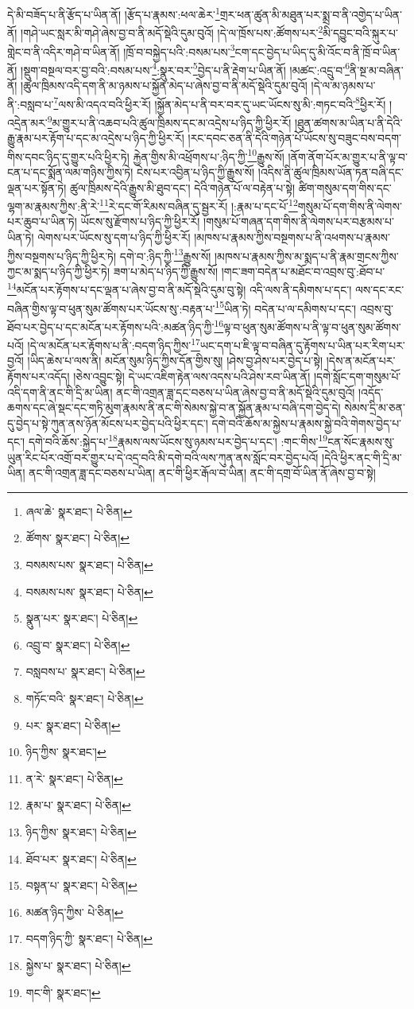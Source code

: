 དེ་མི་བཟོད་པ་ནི་རྩོད་པ་ཡིན་ནོ། །རྩོད་པ་རྣམས་:ཕལ་ཆེར་\footnote{ཞལ་ཆེ་  སྣར་ཐང་།  པེ་ཅིན། }གྲར་ཕན་ཚུན་མི་མཐུན་པར་སྨྲ་བ་ནི་འགྱེད་པ་ཡིན་ནོ། །གཤེ་ཡང་སླར་མི་གཤེ་ཞེས་བྱ་བ་ནི་མདོ་སྡེའི་དུམ་བུའོ། །དེ་ལ་ཁྲོས་པས་:ཚོགས་པར་\footnote{ཚོགས་  སྣར་ཐང་།  པེ་ཅིན། }མི་དབྱུང་བའི་སྐུར་པ་གླེང་བ་ནི་འདིར་གཤེ་བ་ཡིན་ནོ། །ཁྲོ་བ་བསྐྱེད་པའི་:བསམ་པས་\footnote{བསམས་པས་  སྣར་ཐང་།  པེ་ཅིན། }ངག་དང་བྱེད་པ་ཡིད་དུ་མི་འོང་བ་ནི་ཁྲོ་བ་ཡིན་ནོ། །སྡུག་བསྔལ་བར་བྱ་བའི་:བསམ་པས་\footnote{བསམས་པས་  སྣར་ཐང་།  པེ་ཅིན། }:སྣུར་བར་\footnote{སྣུན་པར་  སྣར་ཐང་།  པེ་ཅིན། }བྱེད་པ་ནི་རྡེག་པ་ཡིན་ནོ། །མཚང་:འདྲུ་བ་\footnote{འབྲུ་བ་  སྣར་ཐང་།  པེ་ཅིན། }ནི་སྔ་མ་བཞིན་ནོ། །ཚུལ་ཁྲིམས་འདི་དག་ནི་མ་ཉམས་པ་སྐྱོན་མེད་པ་ཞེས་བྱ་བ་ནི་མདོ་སྡེའི་དུམ་བུའོ། །དེ་ལ་མ་ཉམས་པ་ནི་:བསླབ་པ་\footnote{བསླབས་པ་  སྣར་ཐང་།  པེ་ཅིན། }ལས་མི་འདའ་བའི་ཕྱིར་རོ། །སྐྱོན་མེད་པ་ནི་བར་བར་དུ་ཡང་ཡོངས་སུ་མི་:གཏང་བའི་\footnote{གཏོང་བའི་  སྣར་ཐང་།  པེ་ཅིན། }ཕྱིར་རོ། །འདྲེན་མར་\footnote{པར་  སྣར་ཐང་།  པེ་ཅིན། }མ་གྱུར་པ་ནི་འཆབ་པའི་ཚུལ་ཁྲིམས་དང་མ་འདྲེས་པ་ཉིད་ཀྱི་ཕྱིར་རོ། །ཐུན་ཚགས་མ་ཡིན་པ་ནི་དེའི་རྒྱུ་རྣམ་པར་རྟོག་པ་དང་མ་འདྲེས་པ་ཉིད་ཀྱི་ཕྱིར་རོ། །རང་དབང་ཅན་ནི་དེའི་གཉེན་པོ་ཡོངས་སུ་བཟུང་བས་བདག་གིས་དབང་ཉིད་དུ་གྱུར་པའི་ཕྱིར་ཏེ། རྐྱེན་གྱིས་མི་འཕྲོགས་པ་:ཉིད་ཀྱི་\footnote{ཉིད་ཀྱིས་  སྣར་ཐང་། }རྒྱུས་སོ། །ནོག་ནོག་པོར་མ་གྱུར་པ་ནི་ལྟ་བ་ངན་པ་དང་སྨོན་ལམ་གཉིས་ཀྱིས་ཏེ། ངེས་པར་འབྱིན་པ་ཉིད་ཀྱི་རྒྱུས་སོ། །འདིས་ནི་ཚུལ་ཁྲིམས་ཡོན་ཏན་བཞི་དང་ལྡན་པར་སྟོན་ཏེ། ཚུལ་ཁྲིམས་དེའི་རྒྱུས་མི་ཐུབ་དང་། དེའི་གཉེན་པོ་ལ་བརྟེན་པ་སྟེ། ཚིག་གསུམ་དག་གིས་དང་ལྷག་མ་རྣམས་ཀྱིས་:ནི་རེ་\footnote{ན་རེ་  སྣར་ཐང་།  པེ་ཅིན། }རེ་དང་གོ་རིམས་བཞིན་དུ་སྦྱར་རོ། །:རྣམ་པ་དང་པོ་\footnote{རྣམ་པ་  སྣར་ཐང་།  པེ་ཅིན། }གསུམ་པོ་དག་གིས་ནི་ལེགས་པར་ཆུབ་པ་ཡིན་ཏེ། ཡོངས་སུ་རྫོགས་པ་ཉིད་ཀྱི་ཕྱིར་རོ། །གསུམ་པོ་གཞན་དག་གིས་ནི་ལེགས་པར་བརྩམས་པ་ཡིན་ཏེ། ལེགས་པར་ཡོངས་སུ་དག་པ་ཉིད་ཀྱི་ཕྱིར་རོ། །མཁས་པ་རྣམས་ཀྱིས་བསྔགས་པ་ནི་འཕགས་པ་རྣམས་ཀྱིས་བསྔགས་པ་ཉིད་ཀྱི་ཕྱིར་ཏེ། དགེ་བ་:ཉིད་ཀྱི་\footnote{ཉིད་ཀྱིས་  སྣར་ཐང་།  པེ་ཅིན། }རྒྱུས་སོ། །མཁས་པ་རྣམས་ཀྱིས་མ་སྨད་པ་ནི་རྣམ་གྲངས་ཀྱིས་ཀྱང་མ་སྨད་པ་ཉིད་ཀྱི་ཕྱིར་ཏེ། ཟག་པ་མེད་པ་ཉིད་ཀྱི་རྒྱུས་སོ། །གང་ཟག་བདེན་པ་མཐོང་བ་འབྲས་བུ་:ཐོབ་པ་\footnote{ཐོབ་པར་  སྣར་ཐང་།  པེ་ཅིན། }མངོན་པར་རྟོགས་པ་དང་ལྡན་པ་ཞེས་བྱ་བ་ནི་མདོ་སྡེའི་དུམ་བུ་སྟེ། འདི་ལས་ནི་དམིགས་པ་དང་། ལས་དང་རང་བཞིན་གྱིས་ལྟ་བ་ཕུན་སུམ་ཚོགས་པར་ཡོངས་སུ་:བརྟན་པ་\footnote{བསྟན་པ་  སྣར་ཐང་།  པེ་ཅིན། }ཡིན་ཏེ། བདེན་པ་ལ་དམིགས་པ་དང་། འབྲས་བུ་ཐོབ་པར་བྱེད་པ་དང་མངོན་པར་རྟོགས་པའི་:མཚན་ཉིད་ཀྱི་\footnote{མཚན་ཉིད་ཀྱིས་  པེ་ཅིན། }ལྟ་བ་ཕུན་སུམ་ཚོགས་པ་ནི་ལྟ་བ་ཕུན་སུམ་ཚོགས་པའོ། །དེ་ལ་མངོན་པར་རྟོགས་པ་ནི་:བདག་ཉིད་ཀྱིས་\footnote{བདག་ཉིད་ཀྱི་  སྣར་ཐང་།  པེ་ཅིན། }ཡང་དག་པ་ཇི་ལྟ་བ་བཞིན་དུ་རྟོགས་པ་ཡིན་པར་རིག་པར་བྱའོ། །ཡིད་ཆེས་པ་ལས་ནི། མངོན་སུམ་ཉིད་ཀྱིས་དོན་གྱིས་སུ། །ཤེས་བྱ་ཤེས་པར་བྱེད་པ་སྟེ། །དེས་ན་མངོན་པར་རྟོགས་པར་འདོད། །ཅེས་འབྱུང་སྟེ། དེ་ཡང་འཇིག་རྟེན་ལས་འདས་པའི་ཤེས་རབ་ཡིན་ནོ། །དགེ་སློང་དག་གསུམ་པོ་འདི་དག་ནི་ནང་གི་དྲི་མ་ཡིན། ནང་གི་འགྲན་ཟླ་དང་བཅས་པ་ཡིན་ཞེས་བྱ་བ་ནི་མདོ་སྡེའི་དུམ་བུའོ། །འདོད་ཆགས་དང་ཞེ་སྡང་དང་གཏི་མུག་རྣམས་ནི་ནང་གི་སེམས་སྐྱེ་བ་ན་སྐྱོན་རྣམ་པ་བཞི་དག་བྱེད་དེ། སེམས་དྲི་མ་ཅན་དུ་བྱེད་པ་སྟེ་ཀུན་ནས་ཉོན་མོངས་པར་བྱེད་པའི་ཕྱིར་དང་། དགེ་བའི་ཆོས་མ་སྐྱེས་པ་རྣམས་སྐྱེ་བའི་གེགས་བྱེད་པ་དང་། དགེ་བའི་ཆོས་:སྐྱེད་པ་\footnote{སྐྱེས་པ་  སྣར་ཐང་།  པེ་ཅིན། }རྣམས་ལས་ཡོངས་སུ་ཉམས་པར་བྱེད་པ་དང་། :གང་གིས་\footnote{གང་གི་  སྣར་ཐང་། }ངན་སོང་རྣམས་སུ་ཡུན་རིང་པོར་འགྲོ་བར་གྱུར་པ་དེ་འདྲ་བའི་མི་དགེ་བའི་ལས་ཀུན་ནས་སློང་བར་བྱེད་པའོ། །དེའི་ཕྱིར་ནང་གི་དྲི་མ་ཡིན། ནང་གི་འགྲན་ཟླ་དང་བཅས་པ་ཡིན། ནང་གི་ཕྱིར་རྒོལ་བ་ཡིན། ནང་གི་དགྲ་བོ་ཡིན་ནོ་ཞེས་བྱ་བ་སྟེ། 